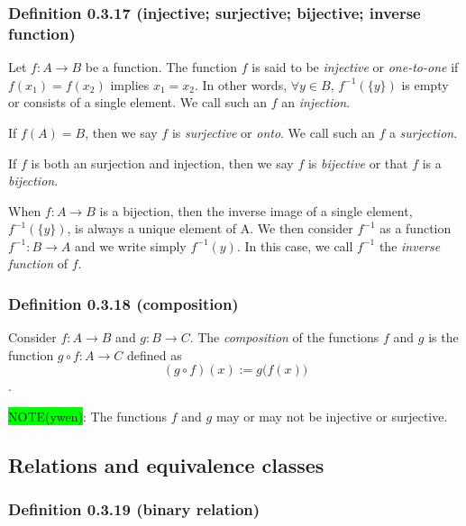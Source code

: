 \documentclass[12pt, letterpaper, oneside]{book}
\begin{document}
\subsubsection{Definition 0.3.17 (injective; surjective; bijective; inverse function)}

Let $f: A \rightarrow B$ be a function. The function $f$ is said to be
\textit{injective} or \textit{one-to-one} if $f(x_1) = f(x_2)$ implies $x_1 =
  x_2$. In other words, $\forall y \in B$, $f^{-1}(\{y\})$ is empty or consists
of a single element. We call such an $f$ an \textit{injection}.

If $f(A) = B$, then we say $f$ is \textit{surjective} or \textit{onto}. We call
such an $f$ a \textit{surjection}.

If $f$ is both an surjection and injection, then we say $f$ is
\textit{bijective} or that $f$ is a \textit{bijection}.

When $f: A \rightarrow B$ is a bijection, then the inverse image of a single
element, $f^{-1}(\{y\})$, is always a unique element of A. We then consider
$f^{-1}$ as a function $f^{-1}: B \rightarrow A$ and we write simply
$f^{-1}(y)$. In this case, we call $f^{-1}$ the \textit{inverse function} of
$f$.

\subsubsection{Definition 0.3.18 (composition)}

Consider $f: A \rightarrow B$ and $g: B \rightarrow C$. The \textit{composition}
of the functions $f$ and $g$ is the function $g \circ f: A \rightarrow C$
defined as \[(g \circ f)(x) := g \bigl(f(x)\bigr)\].

\colorbox{lime}{NOTE(ywen)}: The functions $f$ and $g$ may or may not be
injective or surjective.

\subsection{Relations and equivalence classes}

\subsubsection{Definition 0.3.19 (binary relation)} \label{def:binary-relation}
\end{document}
